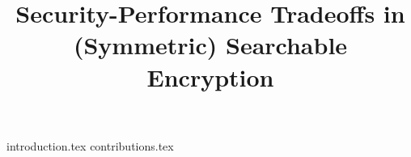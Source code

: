 \documentclass[letterpaper,twocolumn,10pt]{article}
\begin{document}
	
	\title{Security-Performance Tradeoffs in (Symmetric) Searchable Encryption}
	
	\iftoggle{anon}{
		\author{
		\alignauthor
		Anonymous submission
		}
	}{
	\author{Raphael Bost\thanks{Direction Générale de l'Armement - Maîtrise de l'Information \& Université de Rennes 1, France. The views and conclusions contained herein are those of the author and should not be interpreted as necessarily representing the official policies or endorsements, either expressed or implied, of the DGA or the French Government.
	email: \href{mailto:raphael_bost@alumni.brown.edu}{\nolinkurl{raphael_bost@alumni.brown.edu}}
	}
	}
		
	}
	\date{}
	
	\maketitle 
	
	{introduction.tex}
	{contributions.tex}
	
	
	
	
\end{document}
